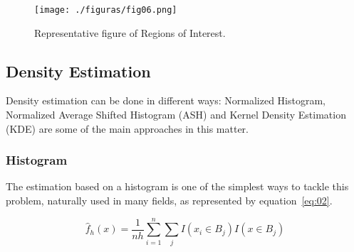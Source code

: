 \documentclass[conference]{IEEEtran}
\begin{document}
\begin{figure}[!h]
	\centering
	\texttt{[image: ./figuras/fig06.png]}
	\caption{Representative figure of Regions of Interest.}
	\label{fig:02}
\end{figure}

\subsection{Density Estimation}\label{KDE}

Density estimation can be done in different ways: Normalized Histogram, Normalized Average Shifted Histogram (ASH) and Kernel Density Estimation (KDE) are some of the main approaches in this matter.


%
%
%
%
%
%
%
\subsubsection{Histogram}

The estimation based on a histogram is one of the simplest ways to tackle this problem, naturally used in many fields, as represented by equation~\ref{eq:02}.

\begin{equation}\label{eq:02}
{\hat f_h}\left( x \right) = \frac{1}{{nh}}\sum\limits_{i = 1}^n {\sum\limits_j {I\left( {{x_i} \in {B_j}} \right)I\left( {x \in {B_j}} \right)} }
\end{equation}
\end{document}

